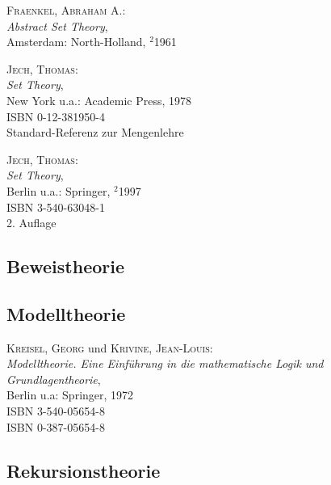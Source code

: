 \begin{description}
  

\item \textsc{Fraenkel, Abraham A.}: \\
  \textit{Abstract Set Theory}, \\
  Amsterdam: North-Holland, $^2$1961
  

\item \textsc{Jech, Thomas}: \\
  \textit{Set Theory}, \\
  New York u.a.: Academic Press, 1978 \\
  ISBN 0-12-381950-4 \\
  Standard-Referenz zur Mengenlehre
  

\item \textsc{Jech, Thomas}: \\
  \textit{Set Theory}, \\
  Berlin u.a.: Springer, $^2$1997 \\
  ISBN 3-540-63048-1 \\
  2. Auflage

\end{description}

\subsection{Beweistheorie}

\subsection{Modelltheorie}

\begin{description}
  

\item \textsc{Kreisel, Georg} und \textsc{Krivine, Jean-Louis}: \\
  \textit{Modelltheorie. Eine Einf\"uhrung in die mathematische Logik und Grundlagentheorie}, \\
  Berlin u.a: Springer, 1972 \\
  ISBN 3-540-05654-8 \\
  ISBN 0-387-05654-8

\end{description}

\subsection{Rekursionstheorie}

